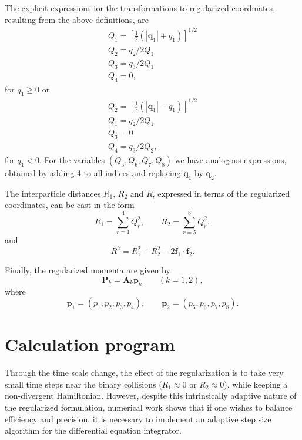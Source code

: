 \documentclass[thmsa]{article}
\begin{document}
The explicit expressions for the transformations to regularized coordinates,
resulting from the above definitions, are 
\begin{equation}
\begin{array}{l}
Q_1=\left[ \frac 12(\left| \mathbf{q}_1\right| +q_1)\right] ^{1/2} \\ 
Q_2=q_2/2Q_1 \\ 
Q_3=q_3/2Q_1 \\ 
Q_4=0,
\end{array}
\label{e6}
\end{equation}
for $q_1\geq 0$ or 
\begin{equation}
\begin{array}{l}
Q_2=\left[ \frac 12(\left| \mathbf{q}_1\right| -q_1)\right] ^{1/2} \\ 
Q_1=q_2/2Q_1 \\ 
Q_3=0 \\ 
Q_4=q_3/2Q_2,
\end{array}
\label{e7}
\end{equation}
for $q_1<0.$ For the variables $(Q_5,Q_6,Q_7,Q_8)$ we have analogous
expressions, obtained by adding 4 to all indices and replacing $\mathbf{q}_1$
by $\mathbf{q}_2$.

The interparticle distances $R_1,\,R_2$ and $R$, expressed in terms of the
regularized coordinates, can be cast in the form 
\begin{equation}
R_1=\sum_{r=1}^4Q_r^2,\quad \quad R_2=\sum_{r=5}^8Q_r^2,  \label{e14}
\end{equation}
and 
\begin{equation}
R^2=R_1^2+R_2^2-2\mathbf{f}_1\cdot \mathbf{f}_2.  \label{e15}
\end{equation}

Finally, the regularized momenta are given by 
\begin{equation}
\mathbf{P}_k=\mathbf{A}_k\mathbf{p}_k\quad \quad (k=1,2),  \label{e10}
\end{equation}
where 
\begin{equation}
\mathbf{p}_1=(p_1,p_2,p_3,p_4),\quad \quad \mathbf{p}_2=(p_5,p_6,p_7,p_8).
\label{e5a}
\end{equation}

\section{Calculation program}

Through the time scale change, the effect of the regularization is to take
very small time steps near the binary collisions ($R_1\approx 0$ or $%
R_2\approx 0$), while keeping a non-divergent Hamiltonian. However, despite
this intrinsically adaptive nature of the regularized formulation, numerical
work shows that if one wishes to balance efficiency and precision, it is
necessary to implement an adaptive step size algorithm for the differential
equation integrator.
\end{document}
